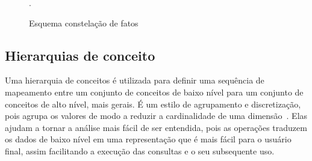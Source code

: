 \begin{figure}[!htb]
	\caption{Esquema constelação de fatos}\label{fig:factconstschema}
	\vspace{6mm}
	\begin{center}
	\end{center}
	\vspace{2mm}
	\legenda{}
	.
\end{figure}

\subsection{Hierarquias de conceito}
\label{ch:fun:cube:concept}

Uma hierarquia de conceitos é utilizada para definir uma sequência de mapeamento entre um conjunto de conceitos de baixo nível para um conjunto de conceitos de alto nível, mais gerais.
É um estilo de agrupamento e discretização, pois agrupa os valores de modo a reduzir a cardinalidade de uma dimensão~\cite{hanDataMiningConcepts2011}.
Elas ajudam a tornar a análise mais fácil de ser entendida, pois as operações traduzem os dados de baixo nível em uma representação que é mais fácil para o usuário final, assim facilitando a execução das consultas e o seu subsequente uso.

